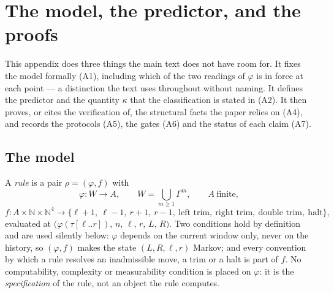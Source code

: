 \section{The model, the predictor, and the proofs}\label{app:evidence}

This appendix does three things the main text does not have room for. It fixes the model
formally (A1), including which of the two readings of $\varphi$ is in force at each point --- a
distinction the text uses throughout without naming. It defines the predictor and the quantity
$\kappa$ that the classification is stated in (A2). It then proves, or cites the verification of,
the structural facts the paper relies on (A4), and records the protocols (A5), the gates (A6) and
the status of each claim (A7).

\subsection{The model}\label{app:model}

\begin{definition}[Rule]\label{def:rule}
A \emph{rule} is a pair $\rho=(\varphi,f)$ with
\[
\varphi:W\to A,\qquad W=\bigcup_{m\ge1}\Gamma^{m},\qquad A\ \text{finite},
\]
\[
f:A\times\mathbb N\times\mathbb N^{4}\longrightarrow
\{\ell{+}1,\ \ell{-}1,\ r{+}1,\ r{-}1,\ \text{left trim},\ \text{right trim},\ \text{double trim},\ \text{halt}\},
\]
evaluated at $\bigl(\varphi(\tau[\ell..r]),\,n,\,\ell,\,r,\,L,\,R\bigr)$. Two conditions hold by
definition and are used silently below: $\varphi$ depends on the current window only, never on the
history, so $(\varphi,f)$ makes the state $(L,R,\ell,r)$ Markov; and every convention by which a
rule resolves an inadmissible move, a trim or a halt is part of $f$. No computability, complexity or
measurability condition is placed on $\varphi$: it is the \emph{specification} of the rule, not an
object the rule computes.
\end{definition}

